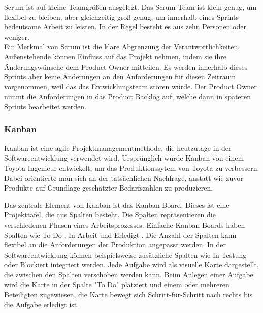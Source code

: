 \documentclass[ngerman]{seminarvorlage}
\begin{document}
Scrum ist auf kleine Teamgrößen ausgelegt. Das Scrum Team ist klein genug, um flexibel zu bleiben, aber gleichzeitig groß genug, um innerhalb eines Sprints bedeutsame Arbeit zu leisten. In der Regel besteht es aus zehn Personen oder weniger.\cite{Mucke.2024}\\
Ein Merkmal von Scrum ist die klare Abgrenzung der Verantwortlichkeiten. Außenstehende können Einfluss auf das Projekt nehmen, indem sie ihre Änderungswünsche dem Product Owner mitteilen. Es werden innerhalb dieses Sprints aber keine Änderungen an den Anforderungen für diesen Zeitraum vorgenommen, weil das das Entwicklungsteam stören würde. Der Product Owner nimmt die Anforderungen in das Product Backlog auf, welche dann in späteren Sprints bearbeitet werden.\cite{Gluck.2022}

\subsubsection{Kanban}
Kanban ist eine agile Projektmanagementmethode, die heutzutage in der Softwareentwicklung verwendet wird. Ursprünglich wurde Kanban von einem Toyota-Ingenieur entwickelt, um das Produktionssytem von Toyota zu verbessern. Dabei orientierte man sich an der tatsächlichen Nachfrage, anstatt wie zuvor Produkte auf Grundlage geschätzter Bedarfszahlen zu produzieren.\cite{Simschek.2022}

Das zentrale Element von Kanban ist das Kanban Board. Dieses ist eine Projekttafel, die aus Spalten besteht. Die Spalten repräsentieren die verschiedenen Phasen eines Arbeitsprozesses. Einfache Kanban Boards haben Spalten wie \glqq To-Do \grqq\: , \glqq In Arbeit \grqq\: und \glqq Erledigt \grqq\: . Die Anzahl der Spalten kann flexibel an die Anforderungen der Produktion angepasst werden.  In der Softwareentwicklung können beispielsweise zusätzliche Spalten wie \glqq In Testung \grqq\: oder \glqq Blockiert\grqq\: integriert werden. Jede Aufgabe wird als visuelle Karte dargestellt, die zwischen den Spalten verschoben werden kann. Beim Anlegen einer Aufgabe wird die Karte in der Spalte "To Do" platziert und einem oder mehreren Beteiligten zugewiesen, die Karte bewegt sich Schritt-für-Schritt nach rechts bis die Aufgabe erledigt ist.\cite{Asana.2024}
\end{document}
